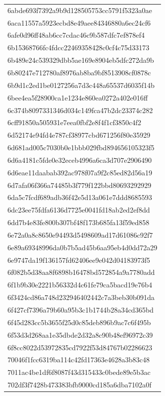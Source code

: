 \begin{tabular}{l}
6abde693f7392a9b9d128505753cc5791f5323a0ae \\
6aca11557a5923ecbd8e49aee84346880a6ec24cf6 \\
6afe0d96ff48ab6cc7cdac46c9b587dfc7ef878ef4 \\
6b15368766fc4fdcc22469358428c0cf4c75d33173 \\
6b489e24c539329dbb5ae169e8904eb5dfc272da9b \\
6b80247e712780af8976ab8ba9bf8513908cf0878c \\
6b9d1c2ed1be0127256a7d3c448a65537d6035f14b \\
6bee4ea5f28900ca1e1234e860ea0272a402e016ff \\
6c374b8097331346d034c149fca47b2dc23374c282 \\
6cff91850a505931e7eea0fbf2e8f4f1cf3850c4f2 \\
6d52174e94fd4e787cf38977cbd671256f80e35929 \\
6d681ad005c7030b0e1bbb029fbd894656105323f5 \\
6d6a4181c5fde0e32eceb4996a6ca3d707e2906490 \\
6d6eae11daabab392ac978f07a9f2c85ed82d56a19 \\
6d7afa06f366a74485b3f779f122bbd80693292929 \\
6da5c7fcdf689adb36f42e5d13a061e7ddd8685593 \\
6dc23ee75fdfa6136d7725e0041fd18ab2ed2ef8dd \\
6dd7b4e83fe800b307bf48f173b685fa13f59ed858 \\
6e72a0a8c8650e94493d5498609ad17d61086c92f7 \\
6e89a69348996da0b7b5ad45b6aa95eb4d0dd72a29 \\
6e9747da19f136157fd62406ee9e042d04183973f5 \\
6f082b5d38aa8f6898b16478bd572854a9a7780add \\
6f1b9b30e2221b56332d4c61fe79ca5bacd19e76b4 \\
6f3424cd86a748d232946402442c7a3beb30b091da \\
6f427cf7396a79b60a95b3c1b1744b28a34cd365bd \\
6f45d283cc5b3655f25d0c85deb896b9ac7c6f495b \\
6f53d3d268aa1e35dbde2d32a8c90b48ef96972c39 \\
6f8cc8022d53972835cd7922f53d84767b02286623 \\
70046f1fcc6319ba114c42fd17363e4628a3b83c48 \\
7011ac4be1df6f8087f43d315433c0bede89e5b3ac \\
702df3f7428b473383bfb9000cd185a6dba7102a0f \\

\end{tabular}
